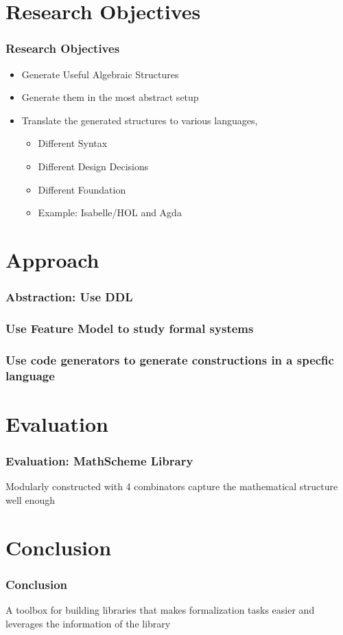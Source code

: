 \documentclass[t,12pt,numbers,fleqn,usenames,xcolor=dvipsnames]{beamer}
\begin{document}
\section{Research Objectives}
\begin{frame}
\frametitle{Research Objectives}
\begin{itemize}
	\item Generate Useful Algebraic Structures 
	\item Generate them in the most abstract setup 
	\item Translate the generated structures to various languages, 
	  \begin{itemize}
	  	\item Different Syntax
	  	\item Different Design Decisions
	  	\item Different Foundation 
	  	\item Example: Isabelle/HOL and Agda 
	  \end{itemize}
\end{itemize}
\end{frame}

\section{Approach}
\begin{frame}
\frametitle{Abstraction: Use DDL}

\end{frame}

\begin{frame}
\frametitle{Use Feature Model to study formal systems}
\end{frame}

\begin{frame}
\frametitle{Use code generators to generate constructions in a specfic language}
\end{frame}

\section{Evaluation}
\begin{frame}
\frametitle{Evaluation: MathScheme Library}
Modularly constructed with 4 combinators 
capture the mathematical structure well enough 
\end{frame}

\section{Conclusion}
\begin{frame}
\frametitle{Conclusion}
A toolbox for building libraries that makes formalization tasks easier and leverages the information of the library 
\end{frame}
\end{document}
